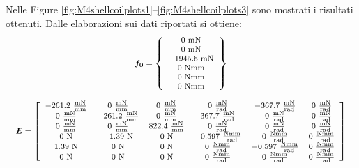 Nelle Figure \ref{fig:M4shellcoilplots1}--\ref{fig:M4shellcoilplots3} sono mostrati i risultati ottenuti.
Dalle elaborazioni sui dati riportati si ottiene:
\begin{equation}
\label{eq:6fc_xzalfa6}
\nonumber
\footnotesize
\begin{array}{c}
\boldsymbol{f_0} = 
\left\{\begin{array}{c}
0~\text{mN}\\
0~\text{mN}\\
-1945.6~\text{mN}\\
0~\text{Nmm}\\
0~\text{Nmm}\\
0~\text{Nmm}
\end{array}\right\}
\\~\\
\boldsymbol{E} = 
\left[\begin{array}{cccccc}
-261.2~\frac{\text{mN}}{\text{mm}} &
0~\frac{\text{mN}}{\text{mm}} &
0~\frac{\text{mN}}{\text{mm}} &
0~\frac{\text{mN}}{\text{rad}} &
-367.7~\frac{\text{mN}}{\text{rad}} &
0~\frac{\text{mN}}{\text{rad}}\\

0~\frac{\text{mN}}{\text{mm}} &
-261.2~\frac{\text{mN}}{\text{mm}} &
0~\frac{\text{mN}}{\text{mm}} &
367.7~\frac{\text{mN}}{\text{rad}} &
0~\frac{\text{mN}}{\text{rad}} &
0~\frac{\text{mN}}{\text{rad}}\\


0~\frac{\text{mN}}{\text{mm}} &
0~\frac{\text{mN}}{\text{mm}} &
822.4~\frac{\text{mN}}{\text{mm}} &
0~\frac{\text{mN}}{\text{rad}} &
0~\frac{\text{mN}}{\text{rad}} &
0~\frac{\text{mN}}{\text{rad}}\\

0~\text{N} &
-1.39~\text{N} &
0~\text{N} &
-0.597~\frac{\text{Nmm}}{\text{rad}} &
0~\frac{\text{Nmm}}{\text{rad}} &
0~\frac{\text{Nmm}}{\text{rad}}\\

1.39~\text{N} &
0~\text{N} &
0~\text{N} &
0~\frac{\text{Nmm}}{\text{rad}} &
-0.597~\frac{\text{Nmm}}{\text{rad}} &
0~\frac{\text{Nmm}}{\text{rad}}\\

0~\text{N} &
0~\text{N} &
0~\text{N} &
0~\frac{\text{Nmm}}{\text{rad}} &
0~\frac{\text{Nmm}}{\text{rad}} &
0~\frac{\text{Nmm}}{\text{rad}}
\end{array}\right]

\end{array}
\end{equation}

